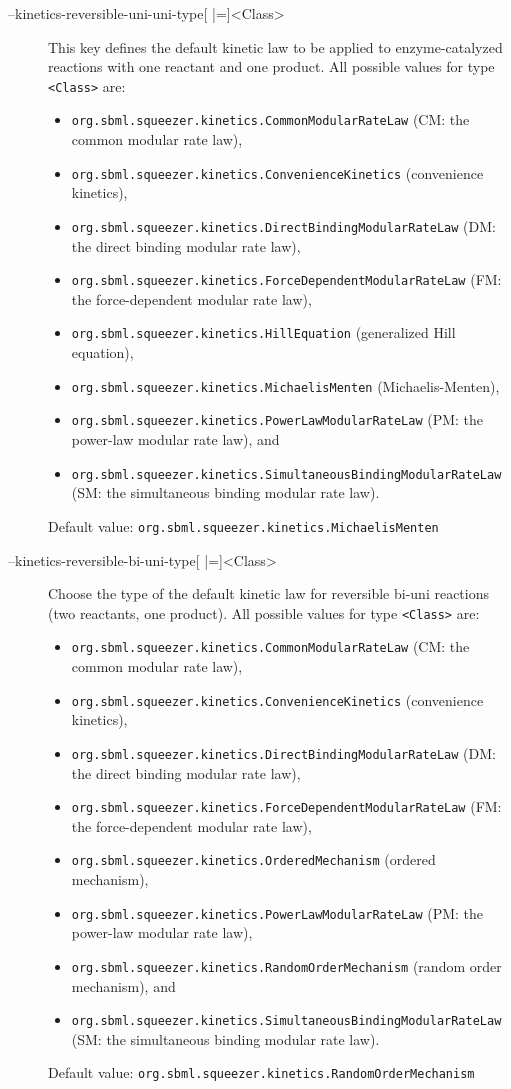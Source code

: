 \begin{description}
\item[--kinetics-reversible-uni-uni-type{[} |={]}<Class>]
  This key defines the default kinetic law to be applied to enzyme-catalyzed
  reactions with one reactant and one product.
  All possible values for type \texttt{<Class>} are:
  \begin{itemize}
  \item\texttt{org.sbml.squeezer.kinetics.CommonModularRateLaw} (CM: the common modular rate law),
  \item\texttt{org.sbml.squeezer.kinetics.ConvenienceKinetics} (convenience kinetics),
  \item\texttt{org.sbml.squeezer.kinetics.DirectBindingModularRateLaw} (DM: the direct binding modular rate law),
  \item\texttt{org.sbml.squeezer.kinetics.ForceDependentModularRateLaw} (FM: the force-dependent modular rate law),
  \item\texttt{org.sbml.squeezer.kinetics.HillEquation} (generalized Hill equation),
  \item\texttt{org.sbml.squeezer.kinetics.MichaelisMenten} (Michaelis-Menten),
  \item\texttt{org.sbml.squeezer.kinetics.PowerLawModularRateLaw} (PM: the power-law modular rate law), and
  \item\texttt{org.sbml.squeezer.kinetics.SimultaneousBindingModularRateLaw} (SM: the simultaneous binding modular rate law).
  \end{itemize}
  Default value: \texttt{org.sbml.squeezer.kinetics.MichaelisMenten}

\item[--kinetics-reversible-bi-uni-type{[} |={]}<Class>]
  Choose the type of the default kinetic law for reversible bi-uni
  reactions (two reactants, one product).
  All possible values for type \texttt{<Class>} are:
  \begin{itemize}
  \item\texttt{org.sbml.squeezer.kinetics.CommonModularRateLaw} (CM: the common modular rate law),
  \item\texttt{org.sbml.squeezer.kinetics.ConvenienceKinetics} (convenience kinetics),
  \item\texttt{org.sbml.squeezer.kinetics.DirectBindingModularRateLaw} (DM: the direct binding modular rate law),
  \item\texttt{org.sbml.squeezer.kinetics.ForceDependentModularRateLaw} (FM: the force-dependent modular rate law),
  \item\texttt{org.sbml.squeezer.kinetics.OrderedMechanism} (ordered mechanism),
  \item\texttt{org.sbml.squeezer.kinetics.PowerLawModularRateLaw} (PM: the power-law modular rate law),
  \item\texttt{org.sbml.squeezer.kinetics.RandomOrderMechanism} (random order mechanism), and
  \item\texttt{org.sbml.squeezer.kinetics.SimultaneousBindingModularRateLaw} (SM: the simultaneous binding modular rate law).
  \end{itemize}
  Default value: \texttt{org.sbml.squeezer.kinetics.RandomOrderMechanism}


\end{description}
